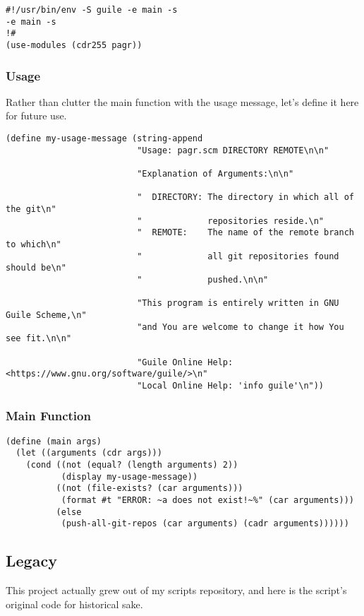 \documentclass[11pt]{article}
\begin{document}
\begin{verbatim}
#!/usr/bin/env -S guile -e main -s
-e main -s
!#
(use-modules (cdr255 pagr))
\end{verbatim}

\subsubsection{Usage}
\label{sec:orgf65042e}
Rather than clutter the main function with the usage message, let's define it
here for future use.

\begin{verbatim}
(define my-usage-message (string-append
                          "Usage: pagr.scm DIRECTORY REMOTE\n\n"
                          
                          "Explanation of Arguments:\n\n"
                          
                          "  DIRECTORY: The directory in which all of the git\n"
                          "             repositories reside.\n"
                          "  REMOTE:    The name of the remote branch to which\n"
                          "             all git repositories found should be\n"
                          "             pushed.\n\n"

                          "This program is entirely written in GNU Guile Scheme,\n"
                          "and You are welcome to change it how You see fit.\n\n"

                          "Guile Online Help: <https://www.gnu.org/software/guile/>\n"
                          "Local Online Help: 'info guile'\n"))
\end{verbatim}

\subsubsection{Main Function}
\label{sec:org357bf87}

\begin{verbatim}
(define (main args)
  (let ((arguments (cdr args)))
    (cond ((not (equal? (length arguments) 2))
           (display my-usage-message))
          ((not (file-exists? (car arguments)))
           (format #t "ERROR: ~a does not exist!~%" (car arguments)))
          (else
           (push-all-git-repos (car arguments) (cadr arguments))))))
\end{verbatim}

\subsection{Legacy}
\label{sec:org9293411}
This project actually grew out of my scripts repository, and here is the
script's original code for historical sake.
\end{document}
